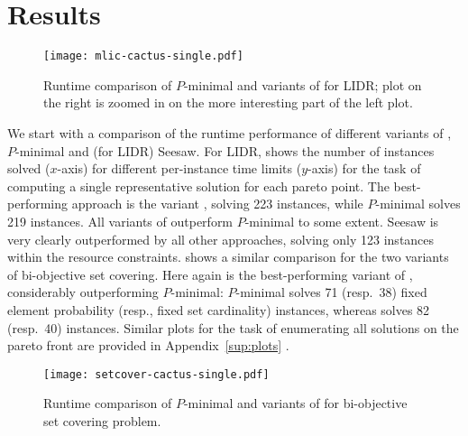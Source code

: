 \section{Results\label{sec:results}}


\begin{figure}
    \centering
    \texttt{[image: mlic-cactus-single.pdf]}
    \caption{Runtime comparison of  $P$-minimal and variants of \algname{} for LIDR; plot on the right
      is zoomed in on the more interesting part of the left plot.
    }\label{fig:mlic-cactus}
\end{figure}

We start with a comparison of the runtime performance of different variants of \algname{}, $P$-minimal and (for LIDR) Seesaw.
For LIDR,  shows the number of instances solved ($x$-axis) for different per-instance time limits ($y$-axis) for the task of computing a single representative solution for each pareto point.
The best-performing approach is the \algname{} variant \msh{}, solving 223 instances, while $P$-minimal solves 219 instances.
All  variants of \algname{} outperform $P$-minimal to some extent.
Seesaw is very clearly outperformed by all other approaches, solving only 123 instances within the resource constraints.
 shows a similar comparison for the two variants of bi-objective set covering.
Here again \msh{} is the best-performing variant of \algname{}, considerably outperforming $P$-minimal:
$P$-minimal solves 71 (resp.~38) fixed element probability (resp., fixed set cardinality) instances, whereas \msh{} solves 82 (resp.~40) instances.
Similar plots for the task of enumerating all solutions on the pareto front are provided in Appendix~\ref{sup:plots} .

\begin{figure}
    \centering
    \texttt{[image: setcover-cactus-single.pdf]}
    \caption{Runtime comparison of $P$-minimal and variants of \algname{} for  bi-objective set covering problem.
    }\label{fig:setcover-cactus}
\end{figure}


